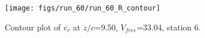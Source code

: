 \begin{figure}[H]
\centering
\texttt{[image: figs/run\_60/run\_60\_R\_contour]}
\caption{Contour plot of $\overline{v_{r}}$ at $z/c$=9.50, $V_{free}$=33.04, station 6.}
\label{fig:run_60_R_contour}
\end{figure}


